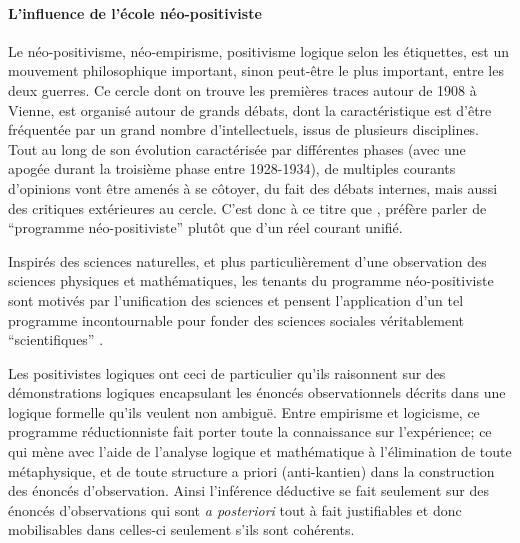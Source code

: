 
\paragraph{L'influence de l'école néo-positiviste}

Le néo-positivisme, néo-empirisme, positivisme logique selon les étiquettes, est un mouvement philosophique important, sinon peut-être le plus important, entre les deux guerres. Ce cercle dont on trouve les premières traces autour de 1908 à Vienne, est organisé autour de grands débats, dont la caractéristique est d'être fréquentée par un grand nombre d'intellectuels, issus de plusieurs disciplines. Tout au long de son évolution caractérisée par différentes phases (avec une apogée durant la troisième phase entre 1928-1934), de multiples courants d'opinions \textcite[126]{Ouelbani2006} vont être amenés à se côtoyer, du fait des débats internes, mais aussi des critiques extérieures au cercle. C'est donc à ce titre que \textcite[11]{Ouelbani2006}, préfère parler de \enquote{programme néo-positiviste} plutôt que d'un réel courant unifié.

Inspirés des sciences naturelles, et plus particulièrement d'une observation des sciences physiques et mathématiques, les tenants du programme néo-positiviste sont motivés par l'unification des sciences et pensent l'application d'un tel programme incontournable pour fonder des sciences sociales véritablement \enquote{scientifiques} \autocite[1-20]{Ouelbani2006}.

Les positivistes logiques ont ceci de particulier qu'ils raisonnent sur des démonstrations logiques encapsulant les énoncés observationnels décrits dans une logique formelle qu'ils veulent non ambiguë. Entre empirisme et logicisme, ce programme réductionniste fait porter toute la connaissance sur l'expérience; ce qui mène avec l'aide de l'analyse logique et mathématique à l'élimination de toute métaphysique, et de toute structure a priori (anti-kantien) dans la construction des énoncés d'observation. Ainsi l'inférence déductive se fait seulement sur des énoncés d'observations qui sont \textit{a posteriori} tout à fait justifiables et donc mobilisables dans celles-ci seulement s'ils sont cohérents.

